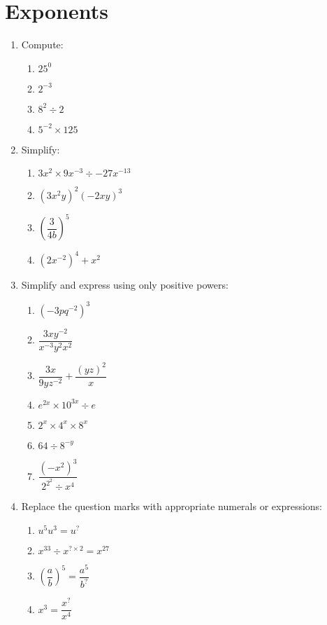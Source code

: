 \documentclass{amsbook}
\begin{document}
\section{Exponents}
\begin{enumerate}
  \item Compute:
    \begin{enumerate}
      \item $ 25^0 $
      \item $ 2^{-3} $
      \item $ 8^2 \div 2 $
      \item $ 5^{-2} \times 125 $
    \end{enumerate}
  \item Simplify:
    \begin{enumerate}
      \item $ 3x^2 \times 9x^{-3} \div -27 x^{-13} $
      \item $ (3x^2 y)^2(-2xy)^3 $
      \item $ \left(\dfrac{3}{4b}\right)^5 $
      \item $ (2x^{-2})^4 + x^2 $
    \end{enumerate}
  \item Simplify and express using only positive powers:
    \begin{enumerate}
      \item $ (-3pq^{-2})^3 $
      \item $ \dfrac{3xy^{-2}}{x^{-3}y^{2}x^{2}} $
      \item $ \dfrac{3x}{9yz^{-2}} + \dfrac{(yz)^2}{x} $
      \item $ e^{2x} \times 10^{3x} \div e $
      \item $ 2^x \times 4^x \times 8^x $
      \item $ 64 \div 8^{-y} $
      \item $ \dfrac{\left(-x^2\right)^3}{2^{2^2} \div x^4} $
    \end{enumerate}
  \item Replace the question marks with appropriate numerals or expressions:
    \begin{enumerate}
      \item $ u^5 u^3 = u^{?} $
      \item $ x^{33} \div x^{? \times 2} = x^{27} $
      \item $ \left(\dfrac{a}{b}\right)^5 = \dfrac{a^5}{b^{?}} $
      \item $ x^3 = \dfrac{x^{?}}{x^4} $
    \end{enumerate}

\end{enumerate}
\end{document}
